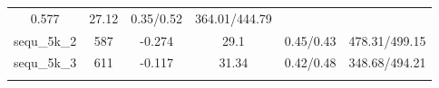 \documentclass[]{article}
\begin{document}
\begin{longtable}[]{@{}cccccc@{}}
\begin{minipage}[t]{0.12\columnwidth}
0.577\strut
\end{minipage} & \begin{minipage}[t]{0.14\columnwidth}\centering\strut
27.12\strut
\end{minipage} & \begin{minipage}[t]{0.17\columnwidth}\centering\strut
0.35/0.52\strut
\end{minipage} & \begin{minipage}[t]{0.22\columnwidth}\centering\strut
364.01/444.79\strut
\end{minipage}\tabularnewline
\begin{minipage}[t]{0.12\columnwidth}\centering\strut
sequ\_5k\_2\strut
\end{minipage} & \begin{minipage}[t]{0.07\columnwidth}\centering\strut
587\strut
\end{minipage} & \begin{minipage}[t]{0.12\columnwidth}\centering\strut
-0.274\strut
\end{minipage} & \begin{minipage}[t]{0.14\columnwidth}\centering\strut
29.1\strut
\end{minipage} & \begin{minipage}[t]{0.17\columnwidth}\centering\strut
0.45/0.43\strut
\end{minipage} & \begin{minipage}[t]{0.22\columnwidth}\centering\strut
478.31/499.15\strut
\end{minipage}\tabularnewline
\begin{minipage}[t]{0.12\columnwidth}\centering\strut
sequ\_5k\_3\strut
\end{minipage} & \begin{minipage}[t]{0.07\columnwidth}\centering\strut
611\strut
\end{minipage} & \begin{minipage}[t]{0.12\columnwidth}\centering\strut
-0.117\strut
\end{minipage} & \begin{minipage}[t]{0.14\columnwidth}\centering\strut
31.34\strut
\end{minipage} & \begin{minipage}[t]{0.17\columnwidth}\centering\strut
0.42/0.48\strut
\end{minipage} & \begin{minipage}[t]{0.22\columnwidth}\centering\strut
348.68/494.21\strut
\end{minipage}\tabularnewline
\begin{minipage}[t]{0.12\columnwidth}\centering\strut

\end{minipage}
\end{longtable}
\end{document}
